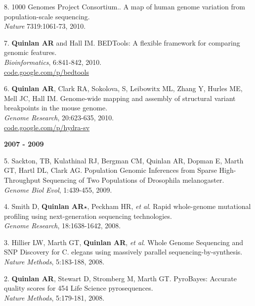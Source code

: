 \documentclass[margin,line]{cv}
\begin{document}
\begin{resume}
\begin{list}{*}{}
    \item[8.] 1000 Genomes Project Consortium..
    A map of human genome variation from population-scale sequencing.\\
    \textit{Nature} 7319:1061-73, 2010.

    \item[7.] \textbf{Quinlan AR} and Hall IM.
    BEDTools: A flexible framework for comparing genomic features.\\
    \textit{Bioinformatics}, 6:841-842, 2010.\\
    \url{code.google.com/p/bedtools}

    \item[6.] \textbf{Quinlan AR}, Clark RA, Sokolova, S, Leibowitx ML, Zhang Y, Hurles ME, Mell JC, Hall IM.
    Genome-wide mapping and assembly of structural variant breakpoints in the mouse genome.\\
    \textit{Genome Research}, 20:623-635, 2010.\\
    \url{code.google.com/p/hydra-sv}

    \end{list}


    \textbf{2007 - 2009} \\
    \begin{list}{*}{}

    \item[5.] Sackton, TB, Kulathinal RJ, Bergman CM, Quinlan AR, Dopman E, Marth GT, Hartl DL, Clark AG.
    Population Genomic Inferences from Sparse High-Throughput Sequencing of Two Populations of Drosophila melanogaster.\\
    \textit{Genome Biol Evol}, 1:439-455, 2009.

    \item[4.] Smith D, \textbf{Quinlan AR}$\star$, Peckham HR, \textit{et al}.
    Rapid whole-genome mutational profiling using next-generation sequencing technologies.\\
    \textit{Genome Research}, 18:1638-1642, 2008.

    \item[3.] Hillier LW, Marth GT, \textbf{Quinlan AR}, \textit{et al}.
    Whole Genome Sequencing and SNP Discovery for C. elegans using massively parallel sequencing-by-synthesis.\\
    \textit{Nature Methods}, 5:183-188, 2008.

    \item[2.] \textbf{Quinlan AR}, Stewart D, Stromberg M, Marth GT.
    PyroBayes: Accurate quality scores for 454 Life Science pyrosequences.\\
    \textit{Nature Methods}, 5:179-181, 2008.


\end{list}
\end{resume}
\end{document}
